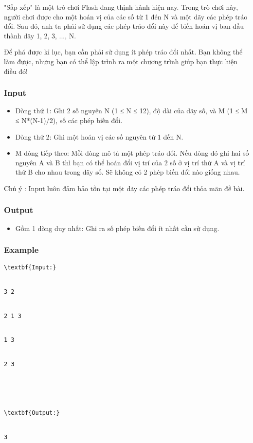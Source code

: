 



   "Sắp xếp" là một trò chơi Flash đang thịnh hành hiện nay. Trong trò chơi này, người chơi được cho một hoán vị của các số từ 1 đén N và một dãy các phép tráo đổi. Sau đó, anh ta phải sử dụng các phép tráo đổi này để biến hoán vị ban đầu thành dãy 1, 2, 3, ..., N.  

   Để phá được kỉ lục, bạn cần phải sử dụng ít phép tráo đổi nhất. Bạn không thể làm được, nhưng bạn có thể lập trình ra một chương trình giúp bạn thực hiện điều đó!  

\subsubsection{   Input  }
\begin{itemize}
	\item     Dòng thứ 1: Ghi 2 số nguyên N (1 ≤ N ≤ 12), độ dài của dãy số, và M (1 ≤ M ≤ N*(N-1)/2), số các phép biến đổi.   
\end{itemize}
\begin{itemize}
	\item     Dòng thứ 2: Ghi một hoán vị các số nguyên từ 1 đến N.   
	\item     M dòng tiếp theo: Mỗi dòng mô tả một phép tráo đổi. Nếu dòng đó ghi hai số nguyên A và B thì bạn có thể hoán đổi vị trí của 2 số ở vị trí thứ A và vị trí thứ B cho nhau trong dãy số. Sẽ không có 2 phép biến đổi nào giống nhau.   
\end{itemize}

Chú ý   : Input luôn đảm bảo tồn tại một dãy các phép tráo đổi thỏa mãn đề bài.  

\subsubsection{   Output  }
\begin{itemize}
	\item     Gồm 1 dòng duy nhất: Ghi ra số phép biến đổi ít nhất cần sử dụng.   
\end{itemize}

\subsubsection{   Example  }
\begin{verbatim}
\textbf{Input:}


3 2


2 1 3


1 3


2 3





\textbf{Output:}


3\end{verbatim}
